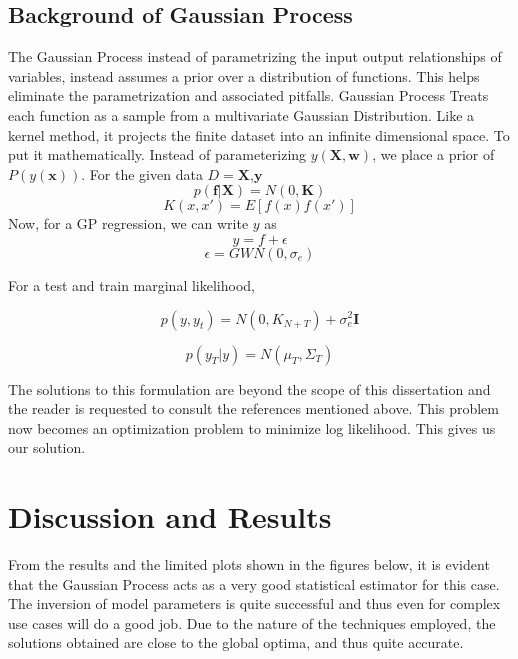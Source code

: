 \subsection{Background of Gaussian Process}
The Gaussian Process instead of parametrizing the input output relationships of variables, instead assumes a prior over a distribution of functions. This helps eliminate the parametrization and associated pitfalls. Gaussian Process Treats each function as a sample from a multivariate Gaussian Distribution. Like a kernel method, it projects the finite dataset into an infinite dimensional space. To put it mathematically. Instead of parameterizing $y(\textbf{X},\textbf{w})$, we place a prior of $P(y(\textbf{x}))$. For the given data $D = {\textbf{X},\textbf{y}}$
\begin{equation}
p(\textbf{f}|\textbf{X}) = N(0,\textbf{K})
\end{equation}    
\begin{equation}
K(x,x') = E[f(x)f(x')]
\end{equation}
Now, for a GP regression, we can write $y$ as
\begin{equation}
y = f + \epsilon
\end{equation}
\begin{equation}
\epsilon = GWN(0,\sigma_e)
\end{equation}

For a test and train marginal likelihood,

\begin{equation}
p(y,y_t) = N(0, K_{N+T}) + \sigma^2_e \textbf{I}
\end{equation}

\begin{equation}
p(y_T | y) = N(\mu_T, \Sigma_T)
\end{equation}

The solutions to this formulation are beyond the scope of this dissertation and the reader is requested to consult the references mentioned above. This problem now becomes an optimization problem to minimize log likelihood. This gives us our solution.
\section{Discussion and Results}

From the results and the limited plots shown in the figures below, it is evident that the Gaussian Process acts as a very good statistical estimator for this case. The inversion of model parameters is quite successful and thus even for complex use cases will do a good job. Due to the nature of the techniques employed, the solutions obtained are close to the global optima, and thus quite accurate.

